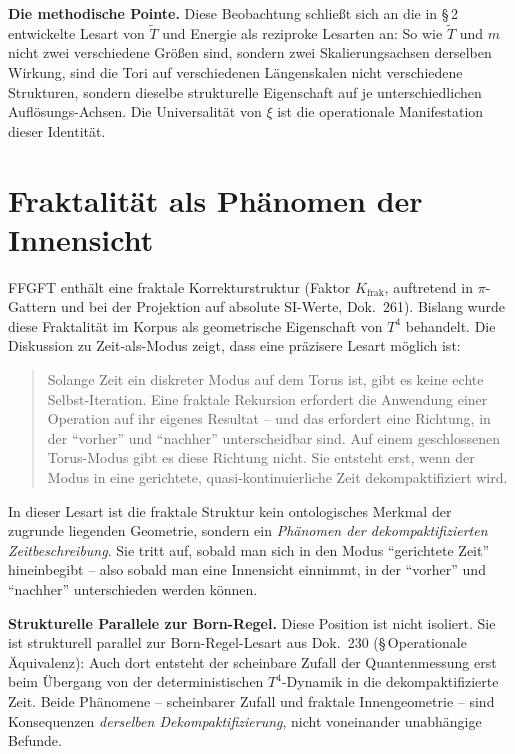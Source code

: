 \textbf{Die methodische Pointe.} Diese Beobachtung schließt sich an
die in §\,2 entwickelte Lesart von $\tilde T$ und Energie als
reziproke Lesarten an: So wie $\tilde T$ und $m$ nicht zwei
verschiedene Größen sind, sondern zwei Skalierungsachsen derselben
Wirkung, sind die Tori auf verschiedenen Längenskalen nicht
verschiedene Strukturen, sondern dieselbe strukturelle Eigenschaft
auf je unterschiedlichen Auflösungs-Achsen. Die Universalität von
$\xi$ ist die operationale Manifestation dieser Identität.

\section{Fraktalität als Phänomen der Innensicht}

FFGFT enthält eine fraktale Korrekturstruktur (Faktor $K_{\text{frak}}$,
auftretend in $\pi$-Gattern und bei der Projektion auf absolute SI-Werte,
Dok.~261). Bislang
wurde diese Fraktalität im Korpus als geometrische Eigenschaft von
$T^4$ behandelt. Die Diskussion zu Zeit-als-Modus zeigt, dass eine
präzisere Lesart möglich ist:

\begin{quote}
Solange Zeit ein diskreter Modus auf dem Torus ist, gibt es keine
echte Selbst-Iteration. Eine fraktale Rekursion erfordert die
Anwendung einer Operation auf ihr eigenes Resultat -- und das
erfordert eine Richtung, in der \enquote{vorher} und \enquote{nachher}
unterscheidbar sind. Auf einem geschlossenen Torus-Modus gibt es
diese Richtung nicht. Sie entsteht erst, wenn der Modus in eine
gerichtete, quasi-kontinuierliche Zeit dekompaktifiziert wird.
\end{quote}

In dieser Lesart ist die fraktale Struktur kein ontologisches Merkmal
der zugrunde liegenden Geometrie, sondern ein \emph{Phänomen der
dekompaktifizierten Zeitbeschreibung}. Sie tritt auf, sobald man sich
in den Modus \enquote{gerichtete Zeit} hineinbegibt -- also sobald
man eine Innensicht einnimmt, in der \enquote{vorher} und
\enquote{nachher} unterschieden werden können.

\textbf{Strukturelle Parallele zur Born-Regel.} Diese Position ist
nicht isoliert. Sie ist strukturell parallel zur Born-Regel-Lesart
aus Dok.~230 (§\,Operationale Äquivalenz): Auch dort entsteht der
scheinbare Zufall der Quantenmessung erst beim Übergang von der
deterministischen $T^4$-Dynamik in die dekompaktifizierte Zeit. Beide
Phänomene -- scheinbarer Zufall und fraktale Innengeometrie -- sind
Konsequenzen \emph{derselben Dekompaktifizierung}, nicht voneinander
unabhängige Befunde.

